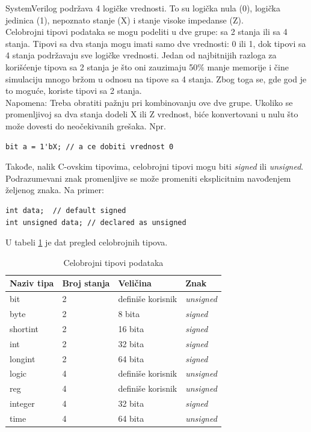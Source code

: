 SystemVerilog podržava 4 logičke vrednosti. To su logička nula (0), logička
jedinica (1), nepoznato stanje (X) i stanje visoke impedanse (Z).\\

Celobrojni tipovi podataka se mogu podeliti u dve grupe: sa 2 stanja ili sa 4
stanja.
Tipovi sa dva stanja mogu imati samo dve vrednosti: 0 ili 1, dok tipovi
sa 4 stanja podržavaju sve logičke vrednosti.
Jedan od najbitnijih razloga za korišćenje tipova sa 2 stanja je što oni
zauzimaju 50\(\%\) manje memorije i čine simulaciju mnogo bržom u odnosu na
tipove sa 4 stanja.
Zbog toga se, gde god je to moguće, koriste tipovi sa 2 stanja.\\

Napomena: Treba obratiti pažnju pri kombinovanju ove dve grupe.
Ukoliko se promenljivoj sa dva stanja dodeli X ili Z vrednost, biće konvertovani
u nulu što može dovesti do neočekivanih grešaka.
Npr.

\begin{lstlisting}
bit a = 1'bX; // a ce dobiti vrednost 0
\end{lstlisting}

Takođe, nalik C-ovskim tipovima, celobrojni tipovi mogu biti \emph{signed} ili
\emph{unsigned}.
Podrazumevani znak promenljive se može promeniti eksplicitnim navođenjem
željenog znaka.
Na primer:

\begin{lstlisting}
int data;  // default signed
int unsigned data; // declared as unsigned
\end{lstlisting}

U tabeli \ref{tab:integer_types} je dat pregled celobrojnih tipova.\\

\begin{table}[h!]
  \centering
  \begin{tabular}{|l|l|l|l|}
    \hline
    \textbf{Naziv tipa} & \textbf{Broj stanja} & \textbf{Veličina} & \textbf{Znak} \\
    \hline
    bit & 2 & definiše korisnik & \emph{unsigned} \\
    \hline
    byte & 2 & 8 bita & \emph{signed} \\
    \hline
    shortint & 2 & 16 bita & \emph{signed} \\
    \hline
    int & 2 & 32 bita & \emph{signed} \\
    \hline
    longint & 2 & 64 bita & \emph{signed} \\
    \hline
    logic & 4 & definiše korisnik & \emph{unsigned} \\
    \hline
    reg & 4 & definiše korisnik & \emph{unsigned} \\
    \hline
    integer & 4 & 32 bita & \emph{signed} \\
    \hline
    time & 4 & 64 bita & \emph{unsigned} \\
    \hline
  \end{tabular}
  \caption{Celobrojni tipovi podataka}
  \label{tab:integer_types}
\end{table}

